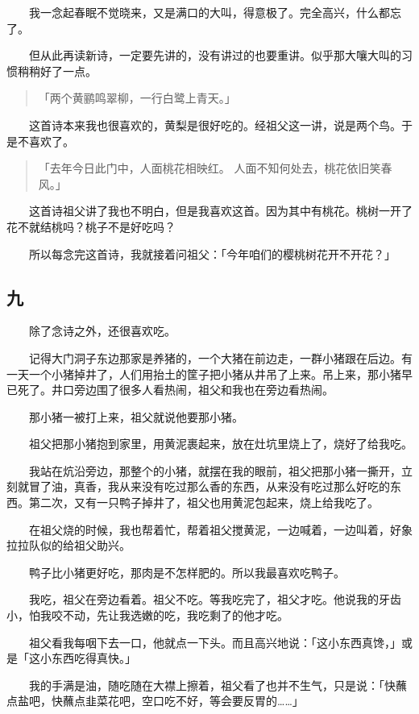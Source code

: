 \documentclass[UTF8]{ctexart}
\begin{document}
　　我一念起春眠不觉晓来，又是满口的大叫，得意极了。完全高兴，什么都忘了。

　　但从此再读新诗，一定要先讲的，没有讲过的也要重讲。似乎那大嚷大叫的习惯稍稍好了一点。

\begin{verse}
    「两个黄鹂鸣翠柳，一行白鹭上青天。」
\end{verse}

　　这首诗本来我也很喜欢的，黄梨是很好吃的。经祖父这一讲，说是两个鸟。于是不喜欢了。

\begin{verse}
    「去年今日此门中，人面桃花相映红。
    人面不知何处去，桃花依旧笑春风。」
\end{verse}

　　这首诗祖父讲了我也不明白，但是我喜欢这首。因为其中有桃花。桃树一开了花不就结桃吗？桃子不是好吃吗？

　　所以每念完这首诗，我就接着问祖父：「今年咱们的樱桃树花开不开花？」

\subsection{九}

　　除了念诗之外，还很喜欢吃。

　　记得大门洞子东边那家是养猪的，一个大猪在前边走，一群小猪跟在后边。有一天一个小猪掉井了，人们用抬土的筐子把小猪从井吊了上来。吊上来，那小猪早已死了。井口旁边围了很多人看热闹，祖父和我也在旁边看热闹。

　　那小猪一被打上来，祖父就说他要那小猪。

　　祖父把那小猪抱到家里，用黄泥裹起来，放在灶坑里烧上了，烧好了给我吃。

　　我站在炕沿旁边，那整个的小猪，就摆在我的眼前，祖父把那小猪一撕开，立刻就冒了油，真香，我从来没有吃过那么香的东西，从来没有吃过那么好吃的东西。第二次，又有一只鸭子掉井了，祖父也用黄泥包起来，烧上给我吃了。

　　在祖父烧的时候，我也帮着忙，帮着祖父搅黄泥，一边喊着，一边叫着，好象拉拉队似的给祖父助兴。

　　鸭子比小猪更好吃，那肉是不怎样肥的。所以我最喜欢吃鸭子。

　　我吃，祖父在旁边看着。祖父不吃。等我吃完了，祖父才吃。他说我的牙齿小，怕我咬不动，先让我选嫩的吃，我吃剩了的他才吃。

　　祖父看我每咽下去一口，他就点一下头。而且高兴地说：「这小东西真馋，」或是「这小东西吃得真快。」

　　我的手满是油，随吃随在大襟上擦着，祖父看了也并不生气，只是说：「快蘸点盐吧，快蘸点韭菜花吧，空口吃不好，等会要反胃的……」
\end{document}
